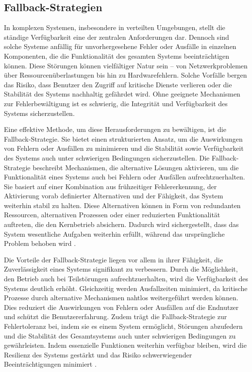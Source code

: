 \subsection{Fallback-Strategien}
In komplexen Systemen, insbesondere in verteilten Umgebungen, stellt die ständige Verfügbarkeit eine der zentralen Anforderungen dar.
Dennoch sind solche Systeme anfällig für unvorhergesehene Fehler oder Ausfälle in einzelnen Komponenten,
die die Funktionalität des gesamten Systems beeinträchtigen können.
Diese Störungen können vielfältiger Natur sein – von Netzwerkproblemen über Ressourcenüberlastungen bis hin zu Hardwarefehlern.
Solche Vorfälle bergen das Risiko, dass Benutzer den Zugriff auf kritische Dienste verlieren oder die Stabilität des
Systems nachhaltig gefährdet wird.
Ohne geeignete Mechanismen zur Fehlerbewältigung ist es schwierig, die Integrität und Verfügbarkeit des Systems sicherzustellen.

Eine effektive Methode, um diese Herausforderungen zu bewältigen, ist die Fallback-Strategie.
Sie bietet einen strukturierten Ansatz, um die Auswirkungen von Fehlern oder Ausfällen zu minimieren und die Stabilität
sowie Verfügbarkeit des Systems auch unter schwierigen Bedingungen sicherzustellen.
Die Fallback-Strategie beschreibt Mechanismen, die alternative Lösungen aktivieren, um die Funktionalität eines Systems
auch bei Fehlern oder Ausfällen aufrechtzuerhalten.
Sie basiert auf einer Kombination aus frühzeitiger Fehlererkennung, der Aktivierung vorab definierter Alternativen und
der Fähigkeit, das System weiterhin stabil zu halten.
Diese Alternativen können in Form von redundanten Ressourcen, alternativen Prozessen oder einer reduzierten
Funktionalität auftreten, die den Kernbetrieb absichern.
Dadurch wird sichergestellt, dass das System wesentliche Aufgaben weiterhin erfüllt,
während das ursprüngliche Problem behoben wird \cite{fallback-strategy}.

Die Vorteile der Fallback-Strategie liegen vor allem in ihrer Fähigkeit, die Zuverlässigkeit eines Systems signifikant zu verbessern.
Durch die Möglichkeit, den Betrieb auch bei Teilstörungen aufrechtzuerhalten,
wird die Verfügbarkeit des Systems deutlich erhöht. Gleichzeitig werden Ausfallzeiten minimiert,
da kritische Prozesse durch alternative Mechanismen nahtlos weitergeführt werden können.
Dies reduziert die Auswirkungen von Fehlern oder Ausfällen auf die Endnutzer und schützt die Benutzererfahrung.
Zudem trägt die Fallback-Strategie zur Fehlertoleranz bei, indem sie es einem System ermöglicht, Störungen abzufedern
und die Stabilität des Gesamtsystems auch unter schwierigen Bedingungen zu gewährleisten.
Indem essenzielle Funktionen weiterhin verfügbar bleiben, wird die Resilienz des Systems gestärkt und das
Risiko schwerwiegender Beeinträchtigungen minimiert \cite{fallback-strategy-cons}.
